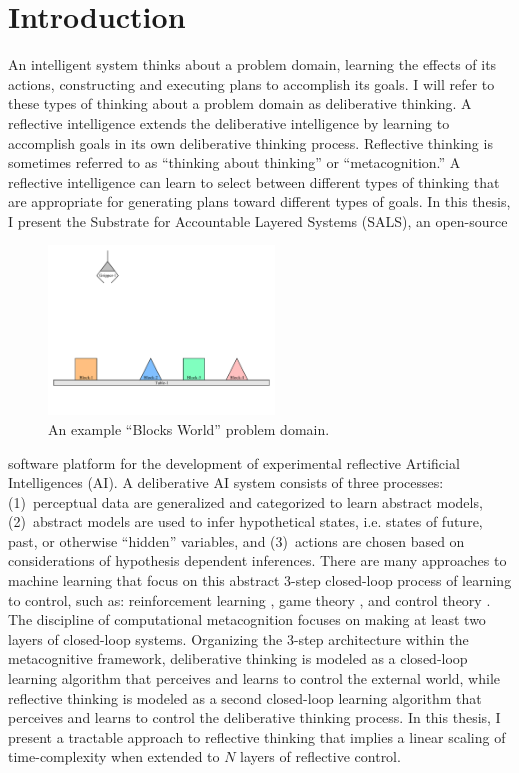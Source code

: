\chapter{Introduction}
\label{chapter:introduction}

An intelligent system thinks about a problem domain, learning the
effects of its actions, constructing and executing plans to accomplish
its goals.  I will refer to these types of thinking about a problem
domain as deliberative thinking.  A reflective intelligence extends
the deliberative intelligence by learning to accomplish goals in its
own deliberative thinking process.  Reflective thinking is sometimes
referred to as ``thinking about thinking'' or ``metacognition.''  A
reflective intelligence can learn to select between different types of
thinking that are appropriate for generating plans toward different
types of goals.  In this thesis, I present the Substrate for
Accountable Layered Systems (SALS), an open-source
\begin{figure}
  \includegraphics[width=6cm]{gfx/blocks_world_large-01}
  \caption[An example ``Blocks World'' problem domain.]{An example
    ``Blocks World'' problem domain.}
  \label{figure:introduction_example_problem_domain}
\end{figure}
software platform for the development of experimental reflective
Artificial Intelligences (AI).  A deliberative AI system consists of
three processes: {\mbox{(1)~perceptual}} data are generalized and
categorized to learn abstract models, {\mbox{(2)~abstract}} models are
used to infer hypothetical states, i.e. states of future, past, or
otherwise ``hidden'' variables, and {\mbox{(3)~actions}} are chosen
based on considerations of hypothesis dependent inferences.  There are
many approaches to machine learning that focus on this abstract 3-step
closed-loop process of learning to control, such as: reinforcement
learning \cite[]{kaelbling:1996,dvzeroski:2001}, game theory
\cite[]{bowling:2000,rapoport:2001}, and control theory
\cite[]{simon:1982, bertsekas:1995}.  The discipline of computational
metacognition \cite[]{cox_and_raja:2008,cox:2010} focuses on making at
least two layers of closed-loop systems.  Organizing the 3-step
architecture within the metacognitive framework, deliberative thinking
is modeled as a closed-loop learning algorithm that perceives and
learns to control the external world, while reflective thinking is
modeled as a second closed-loop learning algorithm that perceives and
learns to control the deliberative thinking process.  In this thesis,
I present a tractable approach to reflective thinking that implies a
linear scaling of time-complexity when extended to $N$ layers of
reflective control.


